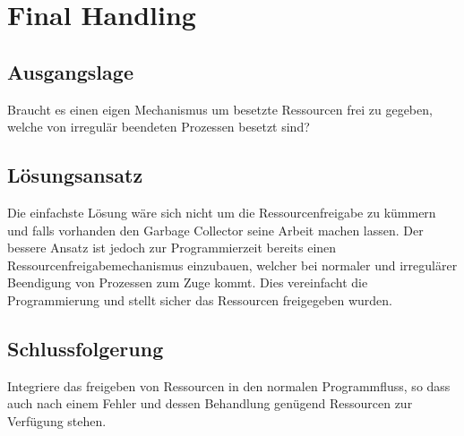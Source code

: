 \section{Final Handling}

\subsection{Ausgangslage}

Braucht es einen eigen Mechanismus um besetzte Ressourcen frei zu gegeben, welche von irregulär beendeten Prozessen besetzt sind?

\subsection{Lösungsansatz}

Die einfachste Lösung wäre sich nicht um die Ressourcenfreigabe zu kümmern und falls vorhanden den Garbage Collector seine Arbeit machen lassen. Der bessere Ansatz ist jedoch zur Programmierzeit bereits einen Ressourcenfreigabemechanismus einzubauen, welcher bei normaler und irregulärer Beendigung von Prozessen zum Zuge kommt. Dies vereinfacht die Programmierung und stellt sicher das Ressourcen freigegeben wurden.

\subsection{Schlussfolgerung}

Integriere das freigeben von Ressourcen in den normalen Programmfluss, so dass auch nach einem Fehler und dessen Behandlung genügend Ressourcen zur Verfügung stehen.

